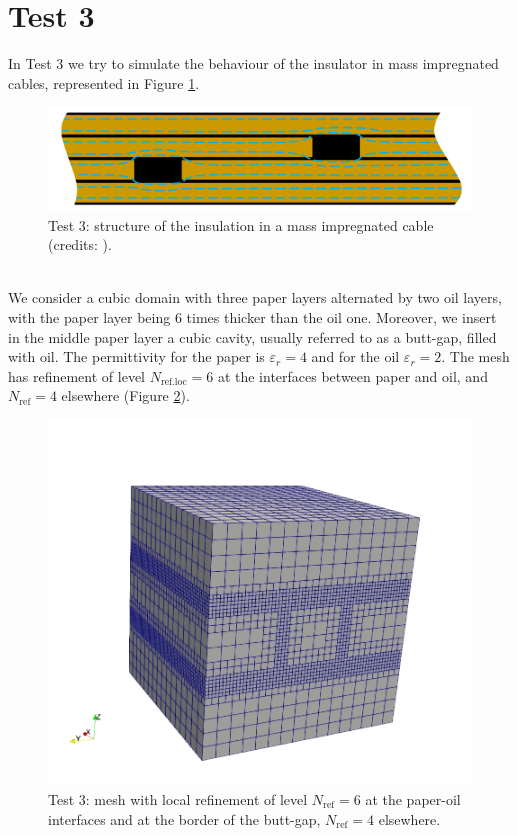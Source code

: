 \documentclass{Configuration_Files/PoliMi3i_thesis}
\let\epsilon\varepsilon
\begin{document}
\section{Test 3}
In Test 3 we try to simulate the behaviour of the insulator in mass impregnated cables, represented in Figure \ref{fig: 3.1}. 
\begin{figure}[h!]
    \centering
   \includegraphics[scale=0.5]{Images/3.butt.png}
    \caption {Test 3: structure of the insulation in a mass impregnated cable (credits: \cite{butt}).}
    \label{fig: 3.1}
\end{figure}
\\We consider a cubic domain with three paper layers alternated by two oil layers, with the paper layer being 6 times thicker than the oil one. Moreover, we insert in the middle paper layer a cubic cavity, usually referred to as a butt-gap, filled with oil. The permittivity for the paper is $\epsilon_r=4$ and for the oil $\epsilon_r=2$.
The mesh has refinement of level $N_\text{ref.loc}=6$ at the interfaces between paper and oil, and $N_\text{ref}=4$ elsewhere (Figure \ref{fig: 3.2}).
\begin{figure}[h!]
    \centering
   \includegraphics[scale=0.25]{Images/3.grid.jpeg}
    \caption {Test 3: mesh with local refinement of level $N_\text{ref}=6$ at the paper-oil interfaces and at the border of the butt-gap, $N_\text{ref}=4$ elsewhere.}
    \label{fig: 3.2}
\end{figure}
\end{document}
